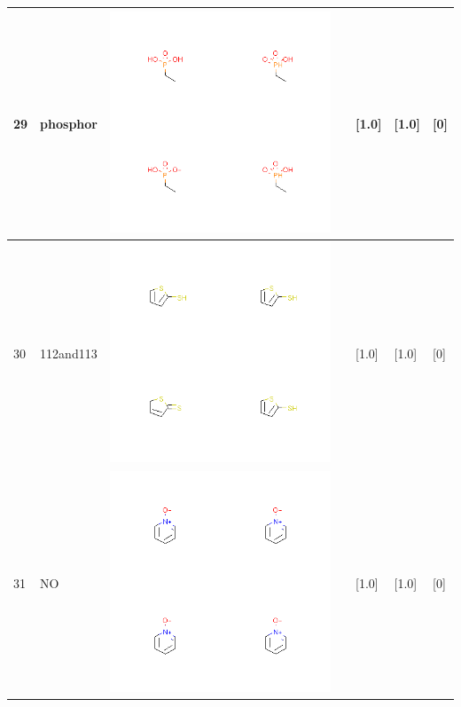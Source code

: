 \begin{longtable}{|l|l|l|l|l|l|l|}
\hline
29 & phosphor & \includegraphics[scale=0.6]{phosphorMV.png} & & [1.0]& [1.0] & [0] \\
\hline
30 & 112and113 & \includegraphics[scale=0.6]{112and113MV.png} & & [1.0]& [1.0] & [0] \\
\hline
31 & NO & \includegraphics[scale=0.6]{NOMV.png} & & [1.0]& [1.0] & [0] \\

\end{longtable}
